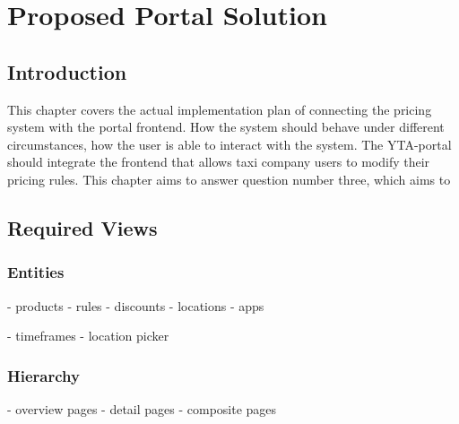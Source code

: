 \graphicspath{{Chapter5/Figs/Vector/}{Chapter5/Figs/}}

%
\chapter{Proposed Portal Solution}

%
\section{Introduction}
This chapter covers the actual implementation plan of connecting the pricing system with the portal frontend. How the system should behave under different circumstances, how the user is able to interact with the system. The YTA-portal should integrate the frontend that allows taxi company users to modify their pricing rules. This chapter aims to answer question number three, which aims to

%
\section{Required Views}

\subsection{Entities}
- products
- rules
- discounts
- locations
- apps

- timeframes
- location picker

\subsection{Hierarchy}
- overview pages
- detail pages
- composite pages



